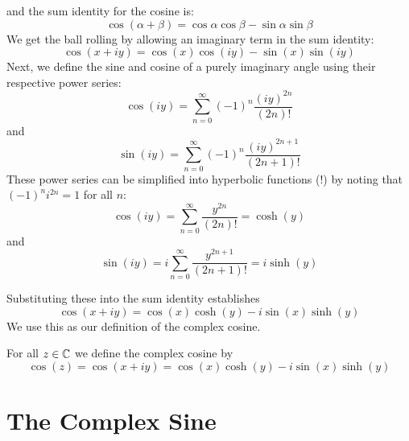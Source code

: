\documentclass[handout]{ximera}
\begin{document}
and the sum identity for the cosine is:
\[
\cos(\alpha + \beta) = \cos\alpha \cos \beta - \sin \alpha \sin \beta
\]
We get the ball rolling by allowing an imaginary term in the sum identity:
\[
\cos(x+iy) = \cos(x) \cos(iy) - \sin(x) \sin(iy)
\]
Next, we define the sine and cosine of a purely imaginary angle using their respective power series:
\[
\cos(iy) = \sum_{n=0}^\infty (-1)^n \frac{(iy)^{2n}}{(2n)!} 
\]
and
\[
\sin(iy) = \sum_{n=0}^\infty (-1)^n \frac{(iy)^{2n+1}}{(2n+1)!} 
\]
These power series can be simplified into hyperbolic functions (!) by noting that $(-1)^n i^{2n} = 1$ for all $n$: 
\[
\cos(iy) = \sum_{n=0}^\infty  \frac{y^{2n}}{(2n)!} = \cosh(y)
\]
and
\[
\sin(iy) = i\sum_{n=0}^\infty \frac {y^{2n+1}}{(2n+1)!}= i\sinh(y)
\]

Substituting these into the sum identity establishes
\[
\cos(x+iy) = \cos(x) \cosh(y) - i\sin(x) \sinh(y)
\]
We use this as our definition of the complex cosine.
\begin{definition}
For all $z \in \mathbb C$ we define the complex cosine by
\[
\cos(z) = \cos(x+iy) = \cos(x) \cosh(y) - i\sin(x) \sinh(y)
\]
\end{definition}


\section{The Complex Sine}
\end{document}
